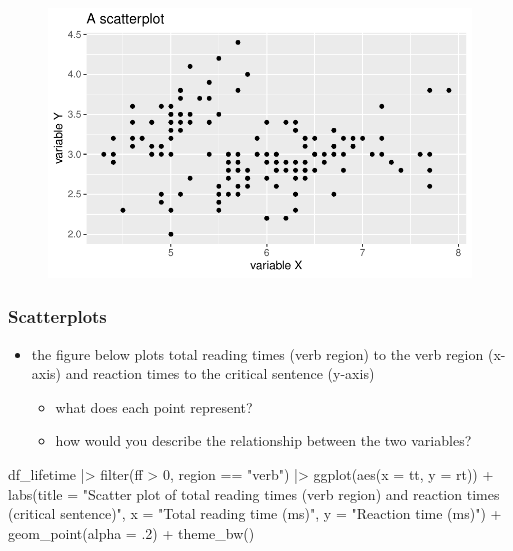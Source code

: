 \documentclass[
  letterpaper,
  DIV=11,
  numbers=noendperiod]{scrartcl}
\newenvironment{Shaded}{\begin{snugshade}}{\end{snugshade}}
\newcommand{\AttributeTok}[1]{\textcolor[rgb]{0.40,0.45,0.13}{#1}}
\newcommand{\DecValTok}[1]{\textcolor[rgb]{0.68,0.00,0.00}{#1}}
\newcommand{\FunctionTok}[1]{\textcolor[rgb]{0.28,0.35,0.67}{#1}}
\newcommand{\NormalTok}[1]{\textcolor[rgb]{0.00,0.23,0.31}{#1}}
\newcommand{\SpecialCharTok}[1]{\textcolor[rgb]{0.37,0.37,0.37}{#1}}
\newcommand{\StringTok}[1]{\textcolor[rgb]{0.13,0.47,0.30}{#1}}
\providecommand{\tightlist}{%
  \setlength{\itemsep}{0pt}\setlength{\parskip}{0pt}}\usepackage{longtable,booktabs,array}
\begin{document}
\begin{figure}[H]

{\centering \includegraphics{_data_viz_files/figure-pdf/unnamed-chunk-24-1.pdf}

}

\end{figure}

\hypertarget{scatterplots-1}{%
\subsubsection{Scatterplots}\label{scatterplots-1}}

\begin{itemize}
\tightlist
\item
  the figure below plots total reading times (verb region) to the verb
  region (x-axis) and reaction times to the critical sentence (y-axis)

  \begin{itemize}
  \tightlist
  \item
    what does each point represent?
  \item
    how would you describe the relationship between the two variables?
  \end{itemize}
\end{itemize}

\begin{Shaded}
\begin{Highlighting}[numbers=left,,]
\NormalTok{df\_lifetime }\SpecialCharTok{|\textgreater{}}
  \FunctionTok{filter}\NormalTok{(ff }\SpecialCharTok{\textgreater{}} \DecValTok{0}\NormalTok{,}
\NormalTok{         region }\SpecialCharTok{==} \StringTok{"verb"}\NormalTok{) }\SpecialCharTok{|\textgreater{}}
  \FunctionTok{ggplot}\NormalTok{(}\FunctionTok{aes}\NormalTok{(}\AttributeTok{x =}\NormalTok{ tt, }\AttributeTok{y =}\NormalTok{ rt)) }\SpecialCharTok{+}
  \FunctionTok{labs}\NormalTok{(}\AttributeTok{title =} \StringTok{"Scatter plot of total reading times (verb region)}
\StringTok{and reaction times (critical sentence)"}\NormalTok{,}
       \AttributeTok{x =} \StringTok{"Total reading time (ms)"}\NormalTok{,}
       \AttributeTok{y =} \StringTok{"Reaction time (ms)"}\NormalTok{) }\SpecialCharTok{+}
  \FunctionTok{geom\_point}\NormalTok{(}\AttributeTok{alpha =}\NormalTok{ .}\DecValTok{2}\NormalTok{) }\SpecialCharTok{+}
  \FunctionTok{theme\_bw}\NormalTok{()}
\end{Highlighting}
\end{Shaded}
\end{document}
